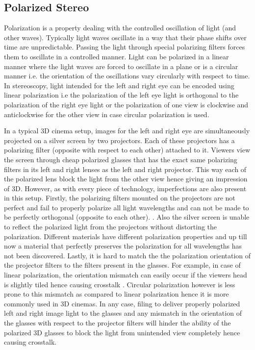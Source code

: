 \subsection{Polarized Stereo}
Polarization is a property dealing with the controlled oscillation of light (and other waves). Typically light waves oscillate in a way that their phase shifts over time are unpredictable. Passing the light through special polarizing filters forces them to oscillate in a controlled manner\cite{ wiki:polarizationwiki}. Light can be polarized in a linear manner where the light waves are forced to oscillate in a plane or is a circular manner i.e. the orientation of the oscillations vary circularly with respect to time. In stereoscopy, light intended for the left and right eye can be encoded using linear polarization i.e the polarization of the left eye light is orthogonal to the polarization of the right eye light or the polarization of one view is clockwise and anticlockwise for the other view in case circular polarization is used.

In a typical 3D cinema setup, images for the left and right eye are simultaneously projected on a silver screen by two projectors. Each of these projectors has a polarizing filter (opposite with respect to each other) attached to it. Viewers view the screen through cheap polarized glasses that has the exact same polarizing filters in its left and right lenses as the left and right projector. This way each of the polarized lens block the light from the other view hence giving an impression of 3D. However, as with every piece of technology, imperfections are also present in this setup. Firstly, the polarizing filters mounted on the projectors are not perfect and fail to properly polarize all light wavelengths and can not be made to be perfectly orthogonal (opposite to each other). \cite{woods2012crosstalk}. Also the silver screen is unable to reflect the polarized light from the projectors without distorting the polarization. Different materials have different polarization properties and up till now a material that perfectly preserves the polarization for all wavelengths has not been discovered. Lastly, it is hard to match the the polarization orientation of the projector filters to the filters present in the glasses. For example, in case of linear polarization, the orientation mismatch can easily occur if the viewers head is slightly tiled hence causing crosstalk \cite{hong2010analysis}. Circular polarization however is less prone to this mismatch as compared to linear polarization hence it is more commonly used in 3D cinemas. In any case, filing to deliver properly polarized left and right image light to the glasses and any mismatch in the orientation of the glasses with respect to the projector filters will hinder the ability of the polarized 3D glasses to block the light from unintended view completely hence causing crosstalk.

